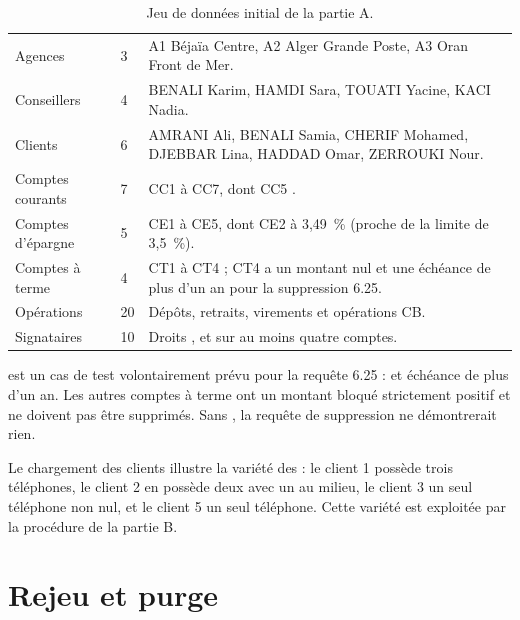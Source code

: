 \begin{table}[htbp]
  \centering
  \small
  \caption{Jeu de données initial de la partie A.}
  \label{tab:jeu-donnees}
  \begin{tabularx}{\textwidth}{@{}L{3.3cm}C{1.6cm}X@{}}
    \toprule
     &  &  \\
    \midrule
    Agences & 3 &
    A1 Béjaïa Centre, A2 Alger Grande Poste, A3 Oran Front de Mer. \\
    Conseillers & 4 &
    BENALI Karim, HAMDI Sara, TOUATI Yacine, KACI Nadia. \\
    Clients & 6 &
    AMRANI Ali, BENALI Samia, CHERIF Mohamed, DJEBBAR Lina, HADDAD Omar,
    ZERROUKI Nour. \\
    Comptes courants & 7 &
    CC1 à CC7, dont CC5 . \\
    Comptes d'épargne & 5 &
    CE1 à CE5, dont CE2 à 3,49~\% (proche de la limite de 3,5~\%). \\
    Comptes à terme & 4 &
    CT1 à CT4 ; CT4 a un montant nul et une échéance de plus d'un an pour la
    suppression 6.25. \\
    Opérations & 20 &
    Dépôts, retraits, virements et opérations CB. \\
    Signataires & 10 &
    Droits ,  et  sur au moins quatre comptes. \\
    \bottomrule
  \end{tabularx}
\end{table}

\begin{remarquebox}
 est un cas de test volontairement prévu pour la requête 6.25 :
 et échéance de plus d'un an. Les autres comptes à
terme ont un montant bloqué strictement positif et ne doivent pas être
supprimés. Sans , la requête de suppression ne démontrerait rien.
\end{remarquebox}

Le chargement des clients illustre la variété des  : le client 1
possède trois téléphones, le client 2 en possède deux avec un  au
milieu, le client 3 un seul téléphone non nul, et le client 5 un seul
téléphone. Cette variété est exploitée par la procédure
 de la partie B.

\section{Rejeu et purge}

